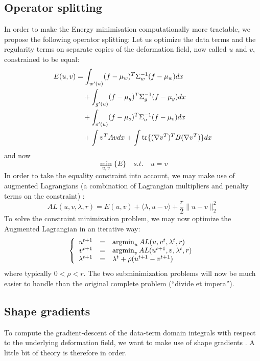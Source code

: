 \subsection{Operator splitting}
In order to make the Energy minimisation computationally more tractable, we propose the following operator splitting: Let us optimize the data terms and the regularity terms on separate copies of the deformation field, now called $u$ and $v$, constrained to be equal:
\begin{align}
E(u,v) &= \int_{w'(u)} (f-\mu_w)^T\Sigma_w^{-1}(f-\mu_w) dx\nonumber\\
&\quad +\int_{g'(u)} (f-\mu_g)^T\Sigma_g^{-1}(f-\mu_g) dx\\
&\quad +\int_{o'(u)} (f-\mu_o)^T\Sigma_o^{-1}(f-\mu_o) dx\nonumber\\
&\quad +\int v^T A v dx + \int \operatorname{tr}\{(\nabla v^T)^T B (\nabla v^T)\} dx\nonumber
\end{align}
and now
\begin{equation}
\min_{u,v} \{ E \} \quad s.t. \quad u = v
\end{equation}
In order to take the equality constraint into account, we may make use of augmented Lagrangians (a combination of Lagrangian multipliers and penalty terms on the constraint)
\cite{bertsekas_multiplier_1976,glowinski_augmented_1989,nocedal_numerical_2006}:
\begin{equation}
AL(u,v,\lambda,r) = E(u,v) + \langle \lambda, u-v \rangle + \frac{r}{2} \| u - v \|_2^2
\end{equation}
To solve the constraint minimization problem, we may now optimize the Augmented Lagrangian in an iterative way:
\begin{equation}
\left\lbrace \begin{array}{rcl}
u^{t+1} &=& \operatorname{argmin}_{u} AL(u,v^t,\lambda^t,r)\\
v^{t+1} &=& \operatorname{argmin}_{v} AL(u^{t+1},v,\lambda^t,r)\\
\lambda^{t+1} &=& \lambda^t + \rho(u^{t+1}-v^{t+1})
\end{array}\right.\end{equation}
where typically $0 < \rho < r$. The two subminimization problems will now be much easier to handle than the original complete problem (``divide et impera'').

\subsection{Shape gradients}
To compute the gradient-descent of the data-term domain integrals with respect to the underlying deformation field, we want to make use of shape gradients \cite{Jehan-Besson2003,herbulot_segmentation_2006}. A little bit of theory is therefore in order.

